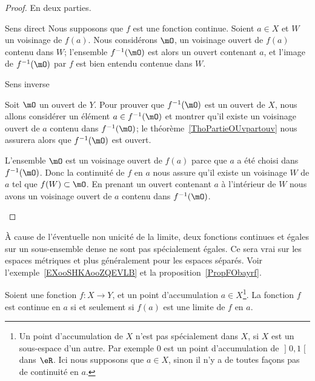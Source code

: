 \begin{proof}
    En deux parties.
    \begin{subproof}
    \item[Sens direct]
        Nous supposons que \( f\) est une fonction continue. Soient \( a\in X\) et \( W\) un voisinage de \( f(a)\). Nous considérons \( \mO\), un voisinage ouvert de \( f(a)\) contenu dans \( W\); l'ensemble \( f^{-1}(\mO)\) est alors un ouvert contenant \( a\), et l'image de \( f^{-1}(\mO)\) par \( f\) est bien entendu contenue dans \( W\).

    \item[Sens inverse]

        Soit \( \mO\) un ouvert de \( Y\). Pour prouver que \( f^{-1}(\mO)\) est un ouvert de \( X\), nous allons considérer un élément \( a\in f^{-1}(\mO)\) et montrer qu'il existe un voisinage ouvert de \( a\) contenu dans \( f^{-1}(\mO)\); le théorème~\ref{ThoPartieOUvpartouv} nous assurera alors que \( f^{-1}(\mO)\) est ouvert.

        L'ensemble \( \mO\) est un voisinage ouvert de \( f(a)\) parce que \( a\) a été choisi dans \( f^{-1}(\mO)\). Donc la continuité de \( f\) en \( a\) nous assure qu'il existe un voisinage \( W\) de \( a\) tel que \( f(W)\subset\mO\). En prenant un ouvert contenant \( a\) à l'intérieur de \( W\) nous avons un voisinage ouvert de \( a\) contenu dans \( f^{-1}(\mO)\).
    \end{subproof}
\end{proof}

\begin{remark}
    À cause de l'éventuelle non unicité de la limite, deux fonctions continues et égales sur un sous-ensemble dense ne sont pas spécialement égales. Ce sera vrai sur les espaces métriques et plus généralement pour les espaces séparés. Voir l'exemple~\ref{EXooSHKAooZQEVLB} et la proposition~\ref{PropFObayrf}.
\end{remark}

\begin{lemma}
Soient une fonction \( f\colon X\to Y\), et un point d'accumulation \( a\in X\)\footnote{Un point d'accumulation de \( X\) n'est pas spécialement dans \( X\), si \( X\) est un sous-espace d'un autre. Par exemple \( 0\) est un point d'accumulation de \( \mathopen] 0 , 1 \mathclose[\) dans \( \eR\). Ici nous supposons que \( a\in X\), sinon il n'y a de toutes façons pas de continuité en \( a\).}. La fonction \( f\) est continue en \( a\) si et seulement si \( f(a)\) est une limite de \( f\) en \( a\).
\end{lemma}

